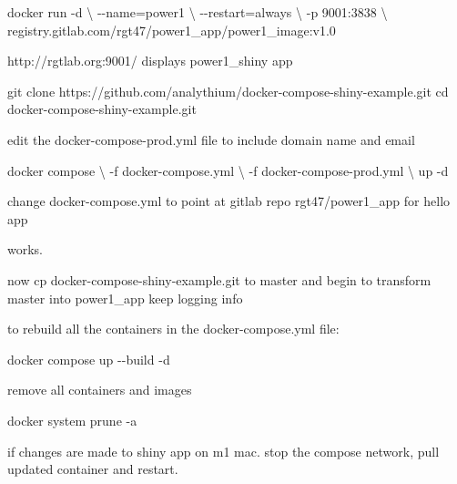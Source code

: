 \documentclass[
  letterpaper,
  DIV=11,
  numbers=noendperiod,
  oneside]{scrartcl}
\newenvironment{Shaded}{\begin{snugshade}}{\end{snugshade}}
\newcommand{\AttributeTok}[1]{\textcolor[rgb]{0.40,0.45,0.13}{#1}}
\newcommand{\BuiltInTok}[1]{\textcolor[rgb]{0.00,0.23,0.31}{#1}}
\newcommand{\ControlFlowTok}[1]{\textcolor[rgb]{0.00,0.23,0.31}{#1}}
\newcommand{\DataTypeTok}[1]{\textcolor[rgb]{0.68,0.00,0.00}{#1}}
\newcommand{\ExtensionTok}[1]{\textcolor[rgb]{0.00,0.23,0.31}{#1}}
\newcommand{\FunctionTok}[1]{\textcolor[rgb]{0.28,0.35,0.67}{#1}}
\newcommand{\NormalTok}[1]{\textcolor[rgb]{0.00,0.23,0.31}{#1}}
\newcommand{\OperatorTok}[1]{\textcolor[rgb]{0.37,0.37,0.37}{#1}}
\newcommand{\StringTok}[1]{\textcolor[rgb]{0.13,0.47,0.30}{#1}}
\begin{document}
\begin{Shaded}
\begin{Highlighting}[]
 \ExtensionTok{docker}\NormalTok{ run }\AttributeTok{{-}d} \DataTypeTok{\textbackslash{}}
    \AttributeTok{{-}{-}name}\OperatorTok{=}\NormalTok{power1 }\DataTypeTok{\textbackslash{}}
    \AttributeTok{{-}{-}restart}\OperatorTok{=}\NormalTok{always }\DataTypeTok{\textbackslash{}}
    \AttributeTok{{-}p}\NormalTok{ 9001:3838 }\DataTypeTok{\textbackslash{}}
\NormalTok{    registry.gitlab.com/rgt47/power1\_app/power1\_image:v1.0}

\ExtensionTok{http://rgtlab.org:9001/}
\ExtensionTok{displays}\NormalTok{ power1\_shiny app }

\FunctionTok{git}\NormalTok{ clone https://github.com/analythium/docker{-}compose{-}shiny{-}example.git}
\BuiltInTok{cd}\NormalTok{ docker{-}compose{-}shiny{-}example.git}

\ExtensionTok{edit}\NormalTok{ the docker{-}compose{-}prod.yml file to include domain name and email}

\ExtensionTok{docker}\NormalTok{ compose }\DataTypeTok{\textbackslash{}}
  \AttributeTok{{-}f}\NormalTok{ docker{-}compose.yml }\DataTypeTok{\textbackslash{}}
  \AttributeTok{{-}f}\NormalTok{ docker{-}compose{-}prod.yml }\DataTypeTok{\textbackslash{}}
\NormalTok{  up }\AttributeTok{{-}d}

\ExtensionTok{change}\NormalTok{ docker{-}compose.yml to point at gitlab repo rgt47/power1\_app for }\StringTok{\textquotesingle{}hello\textquotesingle{}}\NormalTok{ app}

\ExtensionTok{works.}

\ExtensionTok{now}\NormalTok{ cp  docker{-}compose{-}shiny{-}example.git}
\ExtensionTok{to} \StringTok{\textquotesingle{}master\textquotesingle{}}\NormalTok{ and begin to transform }\StringTok{\textquotesingle{}master\textquotesingle{}}\NormalTok{ into }\StringTok{\textquotesingle{}power1\_app\textquotesingle{}}
\ExtensionTok{keep}\NormalTok{ logging info}

\ExtensionTok{to}\NormalTok{ rebuild all the containers in the docker{-}compose.yml file:}

\ExtensionTok{docker}\NormalTok{ compose up }\AttributeTok{{-}{-}build} \AttributeTok{{-}d} 

\ExtensionTok{remove}\NormalTok{ all containers and images }

\ExtensionTok{docker}\NormalTok{ system prune }\AttributeTok{{-}a}

\ControlFlowTok{if} \ExtensionTok{changes}\NormalTok{ are made to shiny app on m1 mac. stop the compose network, pull updated container and restart.}


\end{Highlighting}
\end{Shaded}
\end{document}
